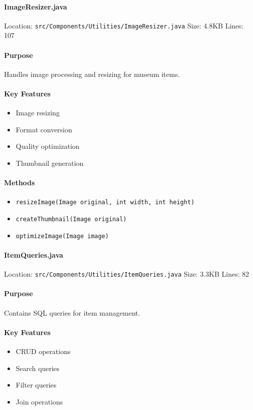 \documentclass[12pt,a4paper]{article}
\begin{document}
\paragraph{ImageResizer.java}
Location: \texttt{src/Components/Utilities/ImageResizer.java}
Size: 4.8KB
Lines: 107

\paragraph{Purpose}
Handles image processing and resizing for museum items.

\paragraph{Key Features}
\begin{itemize}
    \item Image resizing
    \item Format conversion
    \item Quality optimization
    \item Thumbnail generation
\end{itemize}

\paragraph{Methods}
\begin{itemize}
    \item \texttt{resizeImage(Image original, int width, int height)}
    \item \texttt{createThumbnail(Image original)}
    \item \texttt{optimizeImage(Image image)}
\end{itemize}

\paragraph{ItemQueries.java}
Location: \texttt{src/Components/Utilities/ItemQueries.java}
Size: 3.3KB
Lines: 82

\paragraph{Purpose}
Contains SQL queries for item management.

\paragraph{Key Features}
\begin{itemize}
    \item CRUD operations
    \item Search queries
    \item Filter queries
    \item Join operations
\end{itemize}
\end{document}
